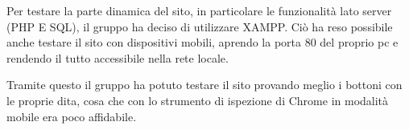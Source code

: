 Per testare la parte dinamica del sito, in particolare le funzionalità lato server (PHP E SQL), il gruppo ha deciso di utilizzare XAMPP. Ciò ha reso possibile
anche testare il sito con dispositivi mobili, aprendo la porta 80 del proprio pc e rendendo il tutto accessibile nella rete locale.

Tramite questo il gruppo ha potuto testare il sito provando meglio i bottoni con le proprie dita, cosa che con lo strumento di ispezione di Chrome in modalità mobile era poco affidabile.